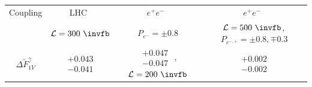 \begin{table}[t]
\begin{center}
\begin{footnotesize}
\begin{tabular}{|cccc|}
\hline
 Coupling & LHC~\protect\cite{Juste:2006sv}  & $e^+e^-$~\protect\cite{Abe:2001nq}&
           $e^+e^-$~\protect\cite{Amjad:2013hca}\\
 & $\mathcal{L}=300~\invfb$ & $P_{e^-}=\pm0.8$ & $\mathcal{L}=500~\invfb$,\, $P_{e^{-,+}} =\pm0.8,\mp0.3$
\\
\hline
$\Delta\widetilde F^\gamma_{1V}$ &
$\begin{matrix} +0.043 \\[-4pt] -0.041\end{matrix}$ &
$\begin{matrix} +0.047 \\[-4pt] -0.047 \end{matrix}$ ,
$\mathcal{L}=200~\invfb$&
$\begin{matrix} +0.002 \\[-4pt] -0.002 \end{matrix}$
\\

\end{tabular}
\end{footnotesize}
\end{center}
\end{table}
